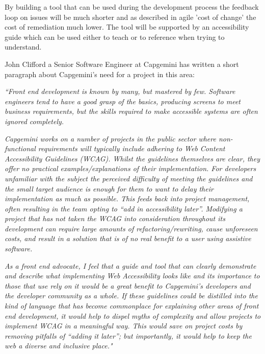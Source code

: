 By building a tool that can be used during
the development process the feedback loop on issues will be much
shorter and as described in agile 'cost of change' the cost of remediation
much lower. The tool will be supported by an accessibility guide which can
be used either to teach or to reference when trying to understand.

John Clifford a Senior Software Engineer at Capgemini has written a short
paragraph about Capgemini's need for a project in this area:
\begin{center}
\label{quote:john}
\textit{
``Front end development is known by many, but mastered by few. Software
engineers tend to have a good grasp of the basics, producing screens to meet
business requirements, but the skills required to make accessible systems are
often ignored completely.}

\textit{
Capgemini works on a number of projects in the public sector where
non-functional requirements will typically include adhering to Web Content
Accessibility Guidelines (WCAG). Whilst the guidelines themselves are clear,
they offer no practical examples/explanations of their implementation. For
developers unfamiliar with the subject the perceived difficulty of meeting the
guidelines and the small target audience is enough for them to want to delay
their implementation as much as possible. This feeds back into project
management, often resulting in the team opting to “add in accessibility later”.
Modifying a project that has not taken the WCAG into consideration throughout
its development can require large amounts of refactoring/rewriting, cause
unforeseen costs, and result in a solution that is of no real benefit to a user
using assistive software.}

\textit{
As a front end advocate, I feel that a guide and tool that can clearly
demonstrate and describe what implementing Web Accessibility looks like and its
importance to those that use rely on it would be a great benefit to Capgemini’s
developers and the developer community as a whole. If these guidelines could
be distilled into the kind of language that has become commonplace for
explaining other areas of front end development, it would help to dispel
myths of complexity and allow projects to implement WCAG in a meaningful way.
This would save on project costs by removing pitfalls of “adding it later”; but
importantly, it would help to keep the web a diverse and inclusive place."}
\end{center}

